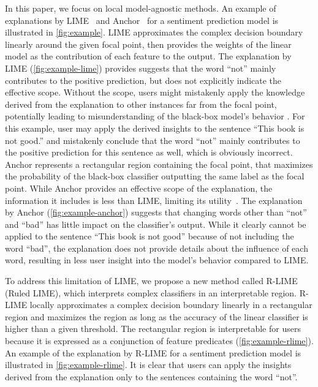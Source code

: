 \documentclass[11pt]{article}
\begin{document}
In this paper,
we focus on local model-agnostic methods.
An example of explanations by LIME~\cite{ribeiro2016why} and
Anchor~\cite{ribeiro2018anchors}
for a sentiment prediction model is illustrated in \cref{fig:example}.
LIME approximates the complex decision boundary
linearly around the given focal point,
then provides the weights of the linear model as the contribution of each feature
to the output.
The explanation by LIME (\cref{fig:example-lime}) provides suggests that
the word ``not'' mainly contributes to the positive prediction,
but does not explicitly indicate the effective scope.
Without the scope,
users might mistakenly apply the knowledge derived from the explanation
to other instances far from the focal point,
potentially leading to misunderstanding of the black-box model's behavior
\cite{ribeiro2018anchors}.
For this example,
user may apply the derived insights
to the sentence ``This book is not good.''
and mistakenly conclude that the word ``not''
mainly contributes to the positive prediction for this sentence as well,
which is obviously incorrect.
Anchor represents a rectangular region
containing the focal point,
that maximizes the probability of the black-box classifier outputting
the same label as the focal point.
While Anchor provides an effective scope of the explanation,
the information it includes is less than LIME,
limiting its utility~\cite{ribeiro2018anchors}.
The explanation by Anchor (\cref{fig:example-anchor})
suggests that changing words other than ``not'' and ``bad''
has little impact on the classifier's output.
While it clearly cannot be applied to the sentence ``This book is not good''
because of not including the word ``bad'',
the explanation does not provide details about the influence of each word,
resulting in less user insight into the model's behavior compared to LIME.

To address this limitation of LIME,
we propose a new method called R-LIME (Ruled LIME),
which interprets complex classifiers in an interpretable region.
R-LIME locally approximates a complex decision boundary linearly
in a rectangular region and maximizes the region
as long as the accuracy of the linear classifier is
higher than a given threshold.
The rectangular region is interpretable for users because it is
expressed as a conjunction of feature predicates (\cref{fig:example-rlime}).
An example of the explanation by R-LIME for a sentiment prediction model
is illustrated in \cref{fig:example-rlime}.
It is clear that users can apply the insights derived from the explanation
only to the sentences containing the word ``not''.
\end{document}
